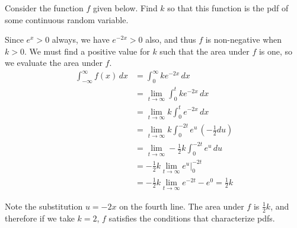 \begin{example}Consider the function $f$ given below. Find $k$ so that this function is the pdf of some continuous random variable.
\renewcommand*{\arraystretch}{1.35}
\renewcommand*{\arraystretch}{1}

Since $e^{x}>0$ always, we have $e^{-2x} > 0$ also, and thus $f$ is non-negative when $k > 0$. We must find a positive value for $k$ such that the area under $f$ is one, so we evaluate the area under $f$.
$$\begin{aligned}\int_{-\infty}^{\infty} f(x) \, dx &= \int_{0}^{\infty} ke^{-2x} \, dx \\ &= \lim_{t \to \infty}\int_{0}^{t} ke^{-2x} \, dx \\ &= \lim_{t \to \infty} k \int_{0}^{t} e^{-2x} \, dx \\ &= \lim_{t \to \infty} k \int_{0}^{-2t} e^{u} \, (-\textstyle\frac{1}{2}du) \\ &= \lim_{t \to \infty} -\textstyle\frac{1}{2}k \int_{0}^{-2t} e^{u} \, du \\ &= -\textstyle\frac{1}{2}k \displaystyle\lim_{t \to \infty}  e^{u} \biggr|_{0}^{-2t} \\ &= -\textstyle\frac{1}{2}k \displaystyle\lim_{t \to \infty}  e^{-2t} - e^{0} = \textstyle\frac{1}{2}k \end{aligned}$$

Note the substitution $u = -2x$ on the fourth line. The area under $f$ is $\frac{1}{2}k$, and therefore if we take $k=2$, $f$ satisfies the conditions that characterize pdfs.
\end{example}

